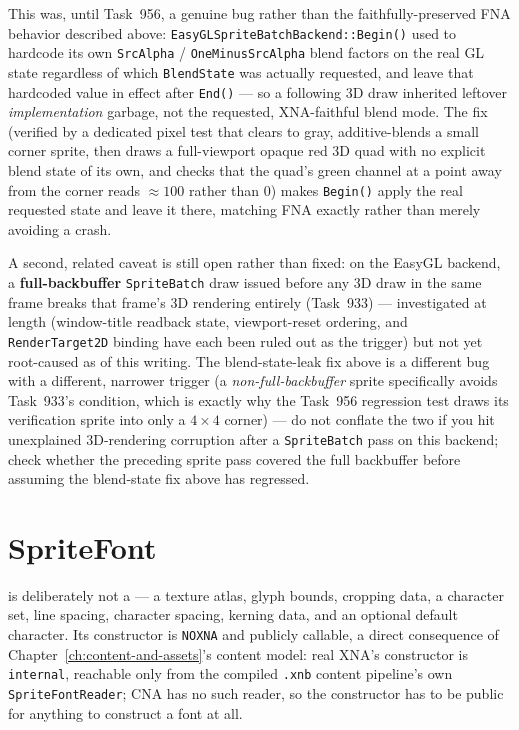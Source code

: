 This was, until Task~956, a genuine bug rather than the faithfully-preserved FNA behavior
described above: \texttt{EasyGLSpriteBatchBackend::Begin()} used to hardcode its own
\texttt{SrcAlpha} / \texttt{OneMinusSrcAlpha} blend factors on the real GL state regardless of
which \texttt{BlendState} was actually requested, and leave that hardcoded value in effect
after \texttt{End()} --- so a following 3D draw inherited leftover \emph{implementation}
garbage, not the requested, XNA-faithful blend mode. The fix (verified by a dedicated pixel
test that clears to gray, additive-blends a small corner sprite, then draws a full-viewport
opaque red 3D quad with no explicit blend state of its own, and checks that the quad's green
channel at a point away from the corner reads $\approx 100$ rather than $0$) makes
\texttt{Begin()} apply the real requested state and leave it there, matching FNA exactly rather
than merely avoiding a crash.

A second, related caveat is still open rather than fixed: on the EasyGL backend, a
\textbf{full-backbuffer} \texttt{SpriteBatch} draw issued before any 3D draw in the same frame
breaks that frame's 3D rendering entirely (Task~933) --- investigated at length (window-title
readback state, viewport-reset ordering, and \texttt{RenderTarget2D} binding have each been
ruled out as the trigger) but not yet root-caused as of this writing. The blend-state-leak fix
above is a different bug with a different, narrower trigger (a \emph{non-full-backbuffer}
sprite specifically avoids Task~933's condition, which is exactly why the Task~956 regression
test draws its verification sprite into only a $4\times4$ corner) --- do not conflate the two
if you hit unexplained 3D-rendering corruption after a \texttt{SpriteBatch} pass on this
backend; check whether the preceding sprite pass covered the full backbuffer before assuming
the blend-state fix above has regressed.

\section{SpriteFont}
\label{sec:spritefont-measure}

 is deliberately not a  --- a texture atlas,
glyph bounds, cropping data, a character set, line spacing, character spacing, kerning data,
and an optional default character. Its constructor is \texttt{NOXNA} and publicly callable,
a direct consequence of Chapter~\ref{ch:content-and-assets}'s content model: real XNA's
 constructor is \texttt{internal}, reachable only from the compiled
\texttt{.xnb} content pipeline's own \texttt{SpriteFontReader}; CNA has no such reader, so the
constructor has to be public for anything to construct a font at all.

